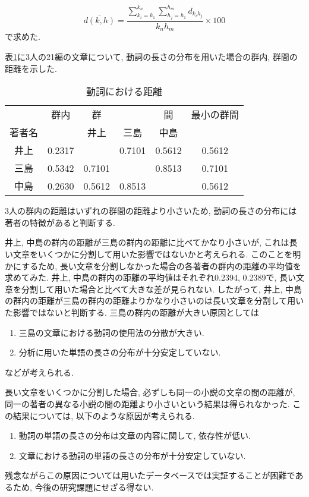 \[\overline{d(k,h)}=\frac{\sum_{k_{i}=k_1}^{k_{n}} \sum_{h_{j}=h_1}^{h_{m}}
d_{k_{i}h_{j}}}{k_{n}h_{m}}\times 100 \]
で求めた.

表\ref{dld}に3人の21編の文章について, 動詞の長さの分布を用いた場合の群内, 群間の距離を示した. 
\begin{table}[htbp]
\caption{\dg 動詞における距離}\label{dld}
\begin{center}
\small{
\begin{tabular}{ c  c c c c c } \hline
       &   群内   &   群     &          &   間     &最小の群間\\      
著者名 &          & 井上     & 三島     & 中島     &          \\ \hline
井上   &   0.2317 &          &  0.7101  &  0.5612  &0.5612    \\ 
三島   &   0.5342 &  0.7101  &          &  0.8513  &0.7101  \\
中島   &   0.2630 &  0.5612  &  0.8513  &          &0.5612 \\ \hline
\end{tabular}
}
\end{center}
\end{table}
3人の群内の距離はいずれの群間の距離より小さいため, 動詞の長さの分布には著者の特徴があると判断する. 

井上, 中島の群内の距離が三島の群内の距離に比べてかなり小さいが, これは長い文章をいくつかに分割して用いた影響ではないかと考えられる. このことを明かにするため, 長い文章を分割しなかった場合の各著者の群内の距離の平均値を求めてみた. 井上, 中島の群内の距離の平均値はそれぞれ0.2394, 0.2389で, 長い文章を分割して用いた場合と比べて大きな差が見られない. したがって, 井上, 中島の群内の距離が三島の群内の距離よりかなり小さいのは長い文章を分割して用いた影響ではないと判断する. 三島の群内の距離が大きい原因としては\begin{enumerate}
\item 三島の文章における動詞の使用法の分散が大きい.
\item 分析に用いた単語の長さの分布が十分安定していない.
\end{enumerate}
などが考えられる. 

長い文章をいくつかに分割した場合, 必ずしも同一の小説の文章の間の距離が, 同一の著者の異なる小説の間の距離より小さいという結果は得られなかった. この結果については, 以下のような原因が考えられる. 
\begin{enumerate}
\item 動詞の単語の長さの分布は文章の内容に関して, 依存性が低い.
\item 文章における動詞の単語の長さの分布が十分安定していない.

\end{enumerate}
残念ながらこの原因については用いたデータベースでは実証することが困難であるため, 今後の研究課題にせざる得ない.

